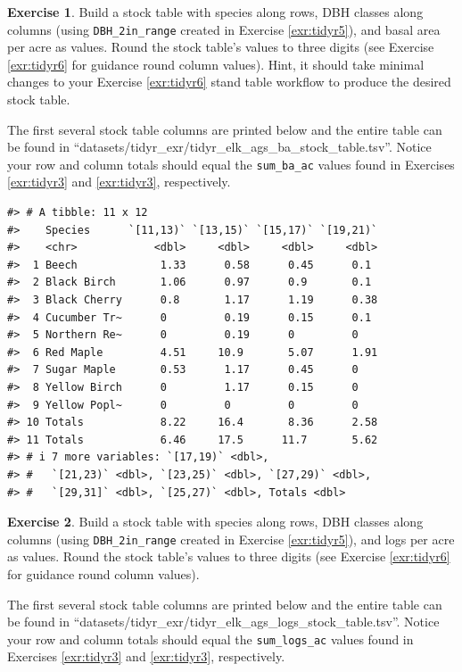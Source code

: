\documentclass[
  11pt,
]{krantz}
\theoremstyle{definition}
\theoremstyle{definition}
\theoremstyle{definition}
\newtheorem{exercise}{Exercise}[chapter]
\theoremstyle{definition}
\theoremstyle{remark}
\begin{document}
\begin{exercise}
\protect\hypertarget{exr:tidyr7}{}\label{exr:tidyr7}Build a stock table with species along rows, DBH classes along columns (using \texttt{DBH\_2in\_range} created in Exercise \ref{exr:tidyr5}), and basal area per acre as values. Round the stock table's values to three digits (see Exercise \ref{exr:tidyr6} for guidance round column values). Hint, it should take minimal changes to your Exercise \ref{exr:tidyr6} stand table workflow to produce the desired stock table.

The first several stock table columns are printed below and the entire table can be found in ``datasets/tidyr\_exr/tidyr\_elk\_ags\_ba\_stock\_table.tsv''. Notice your row and column totals should equal the \texttt{sum\_ba\_ac} values found in Exercises \ref{exr:tidyr3} and \ref{exr:tidyr3}, respectively.
\end{exercise}

\begin{verbatim}
#> # A tibble: 11 x 12
#>    Species      `[11,13)` `[13,15)` `[15,17)` `[19,21)`
#>    <chr>            <dbl>     <dbl>     <dbl>     <dbl>
#>  1 Beech             1.33      0.58      0.45      0.1 
#>  2 Black Birch       1.06      0.97      0.9       0.1 
#>  3 Black Cherry      0.8       1.17      1.19      0.38
#>  4 Cucumber Tr~      0         0.19      0.15      0.1 
#>  5 Northern Re~      0         0.19      0         0   
#>  6 Red Maple         4.51     10.9       5.07      1.91
#>  7 Sugar Maple       0.53      1.17      0.45      0   
#>  8 Yellow Birch      0         1.17      0.15      0   
#>  9 Yellow Popl~      0         0         0         0   
#> 10 Totals            8.22     16.4       8.36      2.58
#> 11 Totals            6.46     17.5      11.7       5.62
#> # i 7 more variables: `[17,19)` <dbl>,
#> #   `[21,23)` <dbl>, `[23,25)` <dbl>, `[27,29)` <dbl>,
#> #   `[29,31]` <dbl>, `[25,27)` <dbl>, Totals <dbl>
\end{verbatim}

\begin{exercise}
\protect\hypertarget{exr:tidyr8}{}\label{exr:tidyr8}Build a stock table with species along rows, DBH classes along columns (using \texttt{DBH\_2in\_range} created in Exercise \ref{exr:tidyr5}), and logs per acre as values. Round the stock table's values to three digits (see Exercise \ref{exr:tidyr6} for guidance round column values).

The first several stock table columns are printed below and the entire table can be found in ``datasets/tidyr\_exr/tidyr\_elk\_ags\_logs\_stock\_table.tsv''. Notice your row and column totals should equal the \texttt{sum\_logs\_ac} values found in Exercises \ref{exr:tidyr3} and \ref{exr:tidyr3}, respectively.
\end{exercise}
\end{document}

